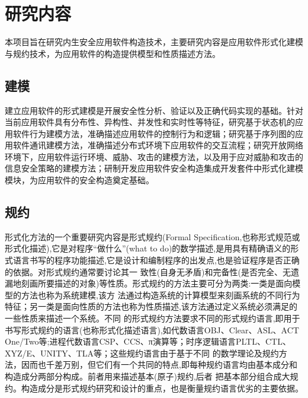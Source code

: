 \chapter{研究内容}
本项目旨在研究内生安全应用软件构造技术，主要研究内容是应用软件形式化建模与规约技术，为应用软件的构造提供模型和性质描述方法。
\section{建模}

\par
建立应用软件的形式建模是开展安全性分析、验证以及正确代码实现的基础。针对当前应用软件具有分布性、异构性、并发性和实时性等特征，研究基于状态机的应用软件行为建模方法，准确描述应用软件的控制行为和逻辑；研究基于序列图的应用软件通讯建模方法，准确描述分布式环境下应用软件的交互流程；研究开放网络环境下，应用软件运行环境、威胁、攻击的建模方法，以及用于应对威胁和攻击的信息安全策略的建模方法；研制开发应用软件安全构造集成开发套件中形式化建模模块，为应用软件的安全构造奠定基础。
\par

\section{规约}

\par
形式化方法的一个重要研究内容是形式规约(Formal Specification,也称形式规范或形式化描述),它是对程序“做什么”(what to do)的数学描述,是用具有精确语义的形式语言书写的程序功能描述,它是设计和编制程序的出发点,也是验证程序是否正确的依据。对形式规约通常要讨论其一 致性(自身无矛盾)和完备性(是否完全、无遗漏地刻画所要描述的对象)等性质。形式规约的方法主要可分为两类:一类是面向模型的方法也称为系统建模,该方 法通过构造系统的计算模型来刻画系统的不同行为特征；另一类是面向性质的方法也称为性质描述,该方法通过定义系统必须满足的一些性质来描述一个系统。不同 的形式规约方法要求不同的形式规约语言,即用于书写形式规约的语言(也称形式化描述语言),如代数语言OBJ、Clear、ASL、ACT One/Two等;进程代数语言CSP、CCS、π演算等；时序逻辑语言PLTL、CTL、XYZ/E、UNITY、TLA等；这些规约语言由于基于不同 的数学理论及规约方法，因而也千差万别，但它们有一个共同的特点,即每种规约语言均由基本成分和构造成分两部分构成。前者用来描述基本(原子)规约,后者 把基本部分组合成大规约。构造成分是形式规约研究和设计的重点，也是衡量规约语言优劣的主要依据。
\par